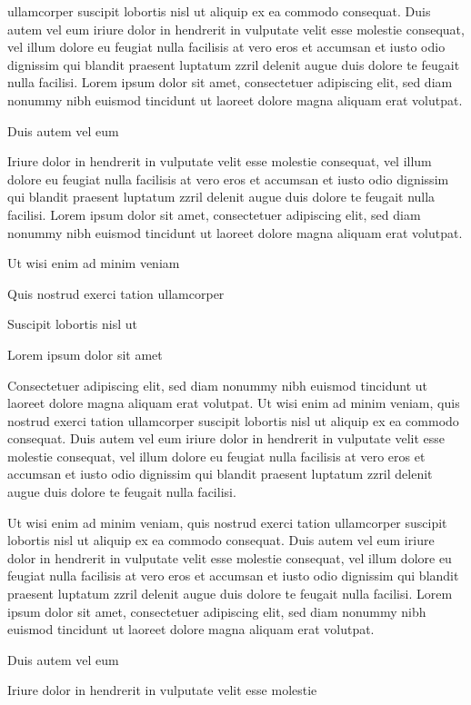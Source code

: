 \documentclass[11pt]{article}\makeatletter
\begin{document}
      ullamcorper suscipit lobortis nisl ut aliquip ex ea commodo
      consequat. Duis autem vel eum iriure dolor in hendrerit in vulputate
      velit esse molestie consequat, vel illum dolore eu feugiat nulla
      facilisis at vero eros et accumsan et iusto odio dignissim qui blandit
      praesent luptatum zzril delenit augue duis dolore te feugait nulla
      facilisi. Lorem ipsum dolor sit amet, consectetuer adipiscing elit,
      sed diam nonummy nibh euismod tincidunt ut laoreet dolore magna
      aliquam erat volutpat. \par Duis autem vel eum \par Iriure dolor in hendrerit in vulputate velit esse molestie
      consequat, vel illum dolore eu feugiat nulla facilisis at vero eros et
      accumsan et iusto odio dignissim qui blandit praesent luptatum zzril
      delenit augue duis dolore te feugait nulla facilisi. Lorem ipsum dolor
      sit amet, consectetuer adipiscing elit, sed diam nonummy nibh euismod
      tincidunt ut laoreet dolore magna aliquam erat volutpat. \par Ut wisi enim ad minim veniam\par Quis nostrud exerci tation ullamcorper \par Suscipit lobortis nisl ut \par Lorem ipsum dolor sit amet\par Consectetuer adipiscing elit, sed diam nonummy nibh euismod
      tincidunt ut laoreet dolore magna aliquam erat volutpat. Ut wisi enim
      ad minim veniam, quis nostrud exerci tation ullamcorper suscipit
      lobortis nisl ut aliquip ex ea commodo consequat. Duis autem vel eum
      iriure dolor in hendrerit in vulputate velit esse molestie consequat,
      vel illum dolore eu feugiat nulla facilisis at vero eros et accumsan
      et iusto odio dignissim qui blandit praesent luptatum zzril delenit
      augue duis dolore te feugait nulla facilisi.\par Ut wisi enim ad minim veniam, quis nostrud exerci tation
      ullamcorper suscipit lobortis nisl ut aliquip ex ea commodo
      consequat. Duis autem vel eum iriure dolor in hendrerit in vulputate
      velit esse molestie consequat, vel illum dolore eu feugiat nulla
      facilisis at vero eros et accumsan et iusto odio dignissim qui blandit
      praesent luptatum zzril delenit augue duis dolore te feugait nulla
      facilisi. Lorem ipsum dolor sit amet, consectetuer adipiscing elit,
      sed diam nonummy nibh euismod tincidunt ut laoreet dolore magna
      aliquam erat volutpat. \par Duis autem vel eum \par Iriure dolor in hendrerit in vulputate velit esse molestie
\end{document}
